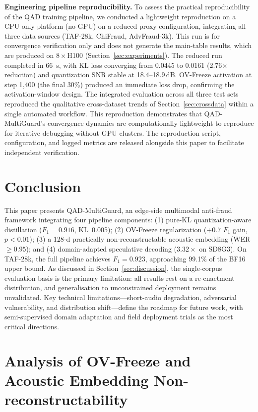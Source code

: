 \documentclass[final,5p,times,number]{elsarticle}
\begin{document}
\medskip
\noindent\textbf{Engineering pipeline reproducibility.}
To assess the practical reproducibility of the QAD training pipeline, we conducted a lightweight reproduction on a CPU-only platform (no GPU) on a reduced proxy configuration, integrating all three data sources (TAF-28k, ChiFraud, AdvFraud-3k). This run is for convergence verification only and does not generate the main-table results, which are produced on $8\times$H100 (Section~\ref{sec:experiments}). The reduced run completed in 66~s, with KL loss converging from 0.0445 to 0.0161 (2.76$\times$ reduction) and quantization SNR stable at 18.4--18.9\,dB. OV-Freeze activation at step 1{,}400 (the final 30\%) produced an immediate loss drop, confirming the activation-window design. The integrated evaluation across all three test sets reproduced the qualitative cross-dataset trends of Section~\ref{sec:crossdata} within a single automated workflow. This reproduction demonstrates that QAD-MultiGuard's convergence dynamics are computationally lightweight to reproduce for iterative debugging without GPU clusters. The reproduction script, configuration, and logged metrics are released alongside this paper to facilitate independent verification.

\section{Conclusion}\label{sec:conclusion}

This paper presents QAD-MultiGuard, an edge-side multimodal anti-fraud framework integrating four pipeline components: (1) pure-KL quantization-aware distillation ($F_1=0.916$, KL~0.005); (2) OV-Freeze regularization ($+0.7$ $F_1$ gain, $p<0.01$); (3) a 128-d practically non-reconstructable acoustic embedding (WER~$\ge 0.95$); and (4) domain-adapted speculative decoding ($3.32\times$ on SD8G3). On TAF-28k, the full pipeline achieves $F_1 = 0.923$, approaching 99.1\% of the BF16 upper bound. As discussed in Section~\ref{sec:discussion}, the single-corpus evaluation basis is the primary limitation: all results rest on a re-enactment distribution, and generalisation to unconstrained deployment remains unvalidated. Key technical limitations---short-audio degradation, adversarial vulnerability, and distribution shift---define the roadmap for future work, with semi-supervised domain adaptation and field deployment trials as the most critical directions.

\appendix
\section{Analysis of OV-Freeze and Acoustic Embedding Non-reconstructability}
\label{app:ovf}
\end{document}
